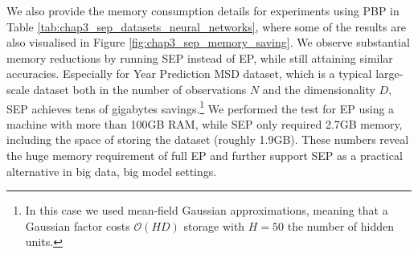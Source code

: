 \begin{table} 
\small
\centering 
\caption{Average test results for all methods on Bayesian neural networks (mean and standard error reported). Datasets are also from the UCI machine learning repository.} 
\label{tab:chap3_sep_pbp_results} 
 \end{table} 


We also provide the memory consumption details for experiments using PBP in Table \ref{tab:chap3_sep_datasets_neural_networks}, where some of the results are also visualised in Figure \ref{fig:chap3_sep_memory_saving}. We observe substantial memory reductions by running SEP instead of EP, while still attaining similar accuracies. Especially for Year Prediction MSD dataset, which is a typical large-scale dataset both in the number of observations $N$ and the dimensionality $D$, SEP achieves tens of gigabytes savings.\footnote{In this case we used mean-field Gaussian approximations, meaning that a Gaussian factor costs $\mathcal{O}(HD)$ storage with $H=50$ the number of hidden units.} We performed the test for EP using a machine with more than 100GB RAM, while SEP only required 2.7GB memory, including the space of storing the dataset (roughly 1.9GB). These numbers reveal the huge memory requirement of full EP and further support SEP as a practical alternative in big data, big model settings.

